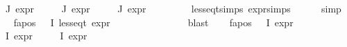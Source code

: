 \begin{isabellebody}
{\isachardoublequoteopen}{\isasymforall}{\isasymphi}{\isasymin}{\isasymPhi}\ {\isacharbackquote}{\kern0pt}\ J{\isachardot}{\kern0pt}\ expr{\isacharunderscore}{\kern0pt}{}\ {\isasymphi}\ {\isasymle}\ {}{\isachardoublequoteclose}\isanewline
{\isachardoublequoteopen}{\isasymforall}{\isasymphi}{\isasymin}{\isasymPhi}\ {\isacharbackquote}{\kern0pt}\ J{\isachardot}{\kern0pt}\ expr{\isacharunderscore}{\kern0pt}{}\ {\isasymphi}\ {\isasymle}\ {}{\isachardoublequoteclose}\isanewline
{\isachardoublequoteopen}{\isasymforall}{\isasymphi}{\isasymin}{\isasymPhi}\ {\isacharbackquote}{\kern0pt}\ J{\isachardot}{\kern0pt}\ expr{\isacharunderscore}{\kern0pt}{}\ {\isasymphi}\ {\isasymle}\ {}{\isachardoublequoteclose}\isanewline
\ \ \ \ \isamarkupfalse%
\ less{\isacharunderscore}{\kern0pt}eq{\isacharunderscore}{\kern0pt}t{\isachardot}{\kern0pt}simps\ expr{\isachardot}{\kern0pt}simps\isanewline
\ \ \ \ \isamarkupfalse%
\ simp{\isacharplus}{\kern0pt}\isanewline
\ \ \isamarkupfalse%
\ fa{\isacharunderscore}{\kern0pt}pos{\isacharcolon}{\kern0pt}\ {\isachardoublequoteopen}{\isasymforall}{\isasymphi}{\isasymin}{\isasymPhi}\ {\isacharbackquote}{\kern0pt}\ I{\isachardot}{\kern0pt}\ less{\isacharunderscore}{\kern0pt}eq{\isacharunderscore}{\kern0pt}t\ {\isacharparenleft}{\kern0pt}expr\ {\isasymphi}{\isacharparenright}{\kern0pt}\ {\isacharparenleft}{\kern0pt}{}{\isacharcomma}{\kern0pt}\ {\isasyminfinity}{\isacharcomma}{\kern0pt}\ {}{\isacharcomma}{\kern0pt}\ {}{\isacharcomma}{\kern0pt}\ {}{\isacharcomma}{\kern0pt}\ {}{\isacharparenright}{\kern0pt}{\isachardoublequoteclose}\isanewline
\ \ \ \ \isamarkupfalse%
\ {}\ \isamarkupfalse%
\ blast\isanewline
\ \ \isamarkupfalse%
\ fa{\isacharunderscore}{\kern0pt}pos{\isacharcolon}{\kern0pt}\ {\isachardoublequoteopen}{\isasymforall}{\isasymphi}{\isasymin}{\isasymPhi}\ {\isacharbackquote}{\kern0pt}\ I{\isachardot}{\kern0pt}\ expr{\isacharunderscore}{\kern0pt}{}\ {\isasymphi}\ {\isasymle}\ {}{\isachardoublequoteclose}\isanewline
{\isachardoublequoteopen}{\isasymforall}{\isasymphi}{\isasymin}{\isasymPhi}\ {\isacharbackquote}{\kern0pt}\ I{\isachardot}{\kern0pt}\ expr{\isacharunderscore}{\kern0pt}{}\ {\isasymphi}\ {\isasymle}\ {}{\isachardoublequoteclose}\isanewline
{\isachardoublequoteopen}{\isasymforall}{\isasymphi}{\isasymin}{\isasymPhi}\ {\isacharbackquote}{\kern0pt}\ I{\isachardot}{\kern0pt}\ expr{\isacharunderscore}{\kern0pt}{}\ {\isasymphi}\ {\isasymle}\ {}{\isachardoublequoteclose}\isanewline

\end{isabellebody}
